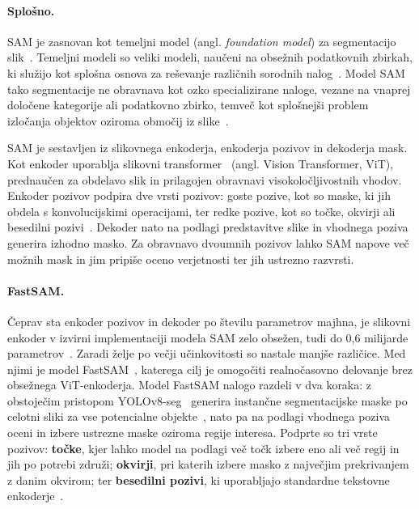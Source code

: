 \documentclass[a4paper,twoside,openright,12pt,slovene]{book}
\begin{document}
            \paragraph{Splošno.}
            SAM je zasnovan kot temeljni model (angl. \textit{foundation model}) za segmentacijo slik~\cite{src:kirillov2023segment, src:bommasani2021opportunities_foundationmodels}. Temeljni modeli so veliki modeli, naučeni na obsežnih podatkovnih zbirkah, ki služijo kot splošna osnova za reševanje različnih sorodnih nalog~\cite{src:bommasani2021opportunities_foundationmodels}. Model SAM tako segmentacije ne obravnava kot ozko specializirane naloge, vezane na vnaprej določene kategorije ali podatkovno zbirko, temveč kot splošnejši problem izločanja objektov oziroma območij iz slike~\cite{src:kirillov2023segment}.

            SAM je sestavljen iz slikovnega enkoderja, enkoderja pozivov in dekoderja mask. Kot enkoder uporablja slikovni transformer~\cite{src:dosovitskiy2020image} (angl. Vision Transformer, ViT), prednaučen za obdelavo slik in prilagojen obravnavi visokoločljivostnih vhodov. Enkoder pozivov podpira dve vrsti pozivov: goste pozive, kot so maske, ki jih obdela s konvolucijskimi operacijami, ter redke pozive, kot so točke, okvirji ali besedilni pozivi~\cite{src:radford2021learning_clip}. Dekoder nato na podlagi predstavitve slike in vhodnega poziva generira izhodno masko. Za obravnavo dvoumnih pozivov lahko SAM napove več možnih mask in jim pripiše oceno verjetnosti ter jih ustrezno razvrsti.

            \paragraph{FastSAM.}
            Čeprav sta enkoder pozivov in dekoder po številu parametrov majhna, je slikovni enkoder v izvirni implementaciji modela SAM zelo obsežen, tudi do 0{,}6 milijarde parametrov~\cite{src:zhao2023fastsegment_fastsam}. Zaradi želje po večji učinkovitosti so nastale manjše različice. Med njimi je model FastSAM~\cite{src:zhao2023fastsegment_fastsam}, katerega cilj je omogočiti realnočasovno delovanje brez obsežnega ViT-enkoderja. Model FastSAM nalogo razdeli v dva koraka: z obstoječim pristopom YOLOv8-seg~\cite{src:yolov8} generira instančne segmentacijske maske po celotni sliki za vse potencialne objekte~\cite{src:yolov8}, nato pa na podlagi vhodnega poziva oceni in izbere ustrezne maske oziroma regije interesa. Podprte so tri vrste pozivov: \textbf{točke}, kjer lahko model na podlagi več točk izbere eno ali več regij in jih po potrebi združi; \textbf{okvirji}, pri katerih izbere masko z največjim prekrivanjem z danim okvirom; ter \textbf{besedilni pozivi}, ki uporabljajo standardne tekstovne enkoderje~\cite{src:radford2021learning_clip}.
        
\end{document}
